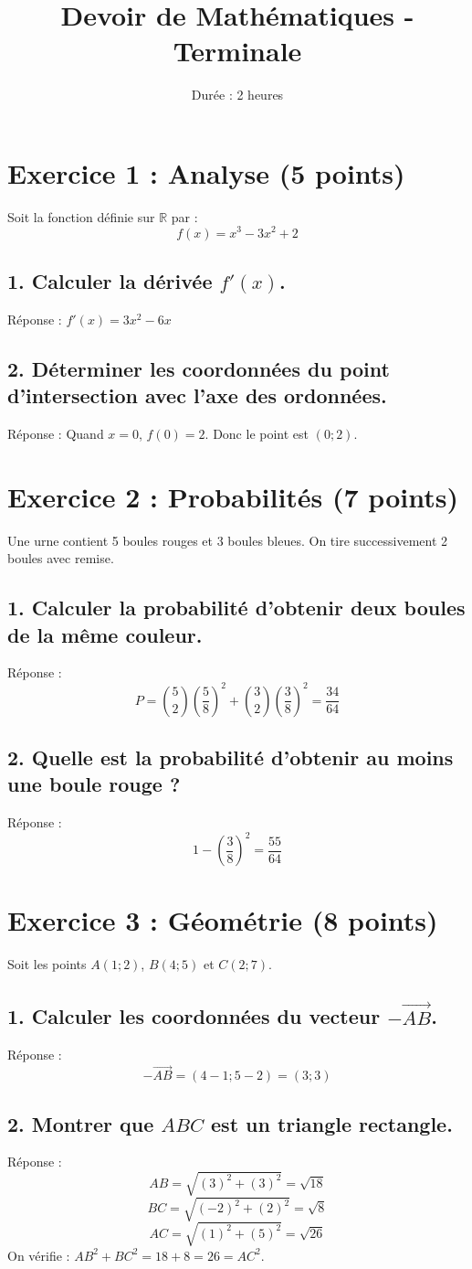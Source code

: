 \documentclass{article}
\begin{document}
\title{Devoir de Mathématiques - Terminale}
\date{Durée : 2 heures}
\maketitle

\section*{Exercice 1 : Analyse (5 points)}
Soit la fonction définie sur $\mathbb{R}$ par : 
\[
f(x) = x^3 - 3x^2 + 2
\]

\subsection*{1. Calculer la dérivée $f'(x)$.}
Réponse : $f'(x) = 3x^2 - 6x$

\subsection*{2. Déterminer les coordonnées du point d'intersection avec l'axe des ordonnées.}
Réponse : Quand $x = 0$, $f(0) = 2$. Donc le point est $(0; 2)$.

\section*{Exercice 2 : Probabilités (7 points)}
Une urne contient 5 boules rouges et 3 boules bleues. On tire successivement 2 boules avec remise.

\subsection*{1. Calculer la probabilité d'obtenir deux boules de la même couleur.}
Réponse : 
\[
P = \binom{5}{2}\left(\frac{5}{8}\right)^2 + \binom{3}{2}\left(\frac{3}{8}\right)^2 = \frac{34}{64}
\]

\subsection*{2. Quelle est la probabilité d'obtenir au moins une boule rouge ?}
Réponse : 
\[
1 - \left(\frac{3}{8}\right)^2 = \frac{55}{64}
\]

\section*{Exercice 3 : Géométrie (8 points)}
Soit les points $A(1; 2)$, $B(4; 5)$ et $C(2; 7)$.

\subsection*{1. Calculer les coordonnées du vecteur $-\vec{AB}$.}
Réponse : 
\[
-\vec{AB} = (4 - 1; 5 - 2) = (3; 3)
\]

\subsection*{2. Montrer que $ABC$ est un triangle rectangle.}
Réponse : 
\[
AB = \sqrt{(3)^2 + (3)^2} = \sqrt{18}
\]
\[
BC = \sqrt{(-2)^2 + (2)^2} = \sqrt{8}
\]
\[
AC = \sqrt{(1)^2 + (5)^2} = \sqrt{26}
\]
On vérifie : $AB^2 + BC^2 = 18 + 8 = 26 = AC^2$.
\end{document}
